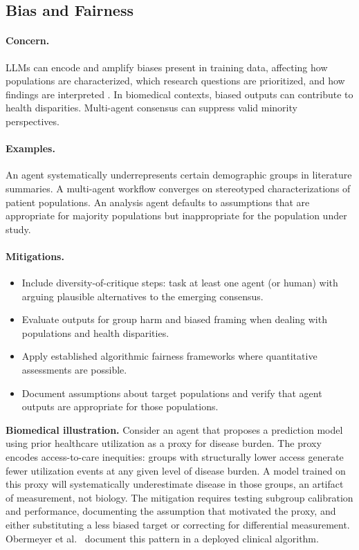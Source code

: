 \documentclass[11pt,letterpaper]{article}
\begin{document}
\subsection{Bias and Fairness}

\paragraph{Concern.} LLMs can encode and amplify biases present in training data, affecting how populations are characterized, which research questions are prioritized, and how findings are interpreted \cite{bender2021,bolukbasi2016,obermeyer2019,mehrabi2021}. In biomedical contexts, biased outputs can contribute to health disparities. Multi-agent consensus can suppress valid minority perspectives.

\paragraph{Examples.} An agent systematically underrepresents certain demographic groups in literature summaries. A multi-agent workflow converges on stereotyped characterizations of patient populations. An analysis agent defaults to assumptions that are appropriate for majority populations but inappropriate for the population under study.

\paragraph{Mitigations.}
\begin{itemize}[leftmargin=*]
    \item Include diversity-of-critique steps: task at least one agent (or human) with arguing plausible alternatives to the emerging consensus.
    \item Evaluate outputs for group harm and biased framing when dealing with populations and health disparities.
    \item Apply established algorithmic fairness frameworks where quantitative assessments are possible.
    \item Document assumptions about target populations and verify that agent outputs are appropriate for those populations.
\end{itemize}

\textbf{Biomedical illustration.} Consider an agent that proposes a prediction model using prior healthcare utilization as a proxy for disease burden. The proxy encodes access-to-care inequities: groups with structurally lower access generate fewer utilization events at any given level of disease burden. A model trained on this proxy will systematically underestimate disease in those groups, an artifact of measurement, not biology. The mitigation requires testing subgroup calibration and performance, documenting the assumption that motivated the proxy, and either substituting a less biased target or correcting for differential measurement. Obermeyer et al.~\cite{obermeyer2019} document this pattern in a deployed clinical algorithm.
\end{document}
